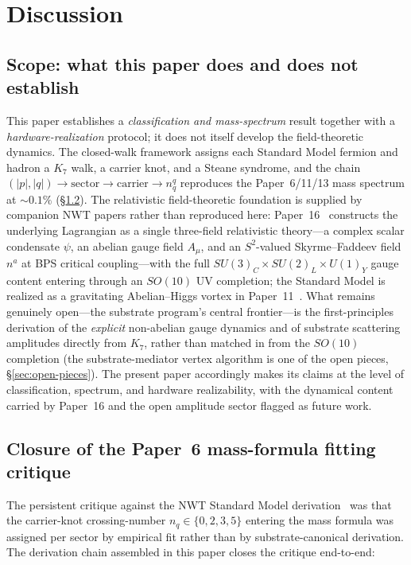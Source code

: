 \documentclass[11pt]{article}
\begin{document}
\section{Discussion}
\label{sec:discussion}

\subsection{Scope: what this paper does and does not establish}
\label{sec:scope}

This paper establishes a \emph{classification and mass-spectrum} result together with a \emph{hardware-realization} protocol; it does not itself develop the field-theoretic dynamics.  The closed-walk framework assigns each Standard Model fermion and hadron a $K_7$ walk, a carrier knot, and a Steane syndrome, and the chain $(|p|, |q|) \to \mathrm{sector} \to \mathrm{carrier} \to n_q^q$ reproduces the Paper~6/11/13 mass spectrum at $\sim 0.1\%$ (\S\ref{sec:fitting-closure}).  The relativistic field-theoretic foundation is supplied by companion NWT papers rather than reproduced here: Paper~16~\cite{Paper16} constructs the underlying Lagrangian as a single three-field relativistic theory---a complex scalar condensate $\psi$, an abelian gauge field $A_\mu$, and an $S^2$-valued Skyrme--Faddeev field $n^a$ at BPS critical coupling---with the full $SU(3)_C \times SU(2)_L \times U(1)_Y$ gauge content entering through an $SO(10)$ UV completion; the Standard Model is realized as a gravitating Abelian--Higgs vortex in Paper~11~\cite{Paper11}.  What remains genuinely open---the substrate program's central frontier---is the first-principles derivation of the \emph{explicit} non-abelian gauge dynamics and of substrate scattering amplitudes directly from $K_7$, rather than matched in from the $SO(10)$ completion (the substrate-mediator vertex algorithm is one of the open pieces, \S\ref{sec:open-pieces}).  The present paper accordingly makes its claims at the level of classification, spectrum, and hardware realizability, with the dynamical content carried by Paper~16 and the open amplitude sector flagged as future work.

\subsection{Closure of the Paper~6 mass-formula fitting critique}
\label{sec:fitting-closure}

The persistent critique against the NWT Standard Model derivation~\cite{Paper6,Paper8,Paper13} was that the carrier-knot crossing-number $n_q \in \{0, 2, 3, 5\}$ entering the mass formula was assigned per sector by empirical fit rather than by substrate-canonical derivation.  The derivation chain assembled in this paper closes the critique end-to-end:
\end{document}
